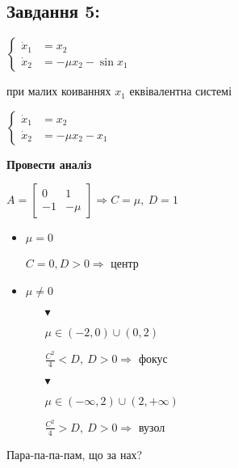 \subsection{Завдання 5:}

$\left\{\begin{aligned}
    \dot{x}_1 &= x_2 \\
    \dot{x}_2 &= -\mu x_2 -\sin x_1
\end{aligned}\right.$

при малих коиваннях $x_1$ еквівалентна системі

$\left\{\begin{aligned}
    \dot{x}_1 &= x_2 \\
    \dot{x}_2 &= -\mu x_2 -x_1
\end{aligned}\right.$

\textbf{Провести аналіз}

$A = \begin{bmatrix}
    0 & 1\\
    -1 & -\mu
\end{bmatrix} \Longrightarrow C = \mu, \ D = 1$

\begin{itemize}
    \item {
    
        $\mu = 0$
        
        $C = 0, D > 0 \Longrightarrow $  центр
    }

    \item {
        $\mu \neq 0$

        \begin{itemize}
            \item[$\blacktriangledown$] {
                $\mu \in (-2, 0) \cup (0, 2)$ 

                $\frac{C^2}{4} < D,\ D > 0 \Longrightarrow $ фокус      
            }

            \item[$\blacktriangledown$] {
                $\mu \in (-\infty, 2) \cup (2, +\infty)$ 

                $\frac{C^2}{4} > D,\ D > 0 \Longrightarrow $ вузол        
            }
        \end{itemize}
    }
\end{itemize}


Пара-па-па-пам, що за нах?